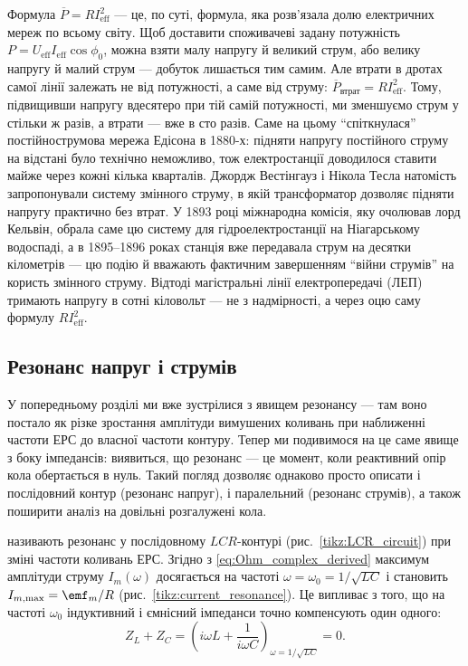 \begin{Historical}
	Формула $\overline{P} = RI_{\text{eff}}^2$ --- це, по суті, формула, яка розв'язала долю електричних мереж по всьому світу. Щоб доставити споживачеві задану потужність $P = U_{\text{eff}}I_{\text{eff}}\cos\phi_0$, можна взяти малу напругу й великий струм, або велику напругу й малий струм --- добуток лишається тим самим. Але втрати в дротах самої лінії залежать не від потужності, а саме від струму: $\overline{P}_{\text{втрат}} = RI_{\text{eff}}^2$. Тому, підвищивши напругу вдесятеро при тій самій потужності, ми зменшуємо струм у стільки ж разів, а втрати --- вже в сто разів. Саме на цьому \enquote{спіткнулася} постійнострумова мережа Едісона в 1880-х: підняти напругу постійного струму на відстані було технічно неможливо, тож електростанції доводилося ставити майже через кожні кілька кварталів. Джордж Вестінгауз і Нікола Тесла натомість запропонували систему змінного струму, в якій трансформатор дозволяє підняти напругу практично без втрат. У 1893 році міжнародна комісія, яку очолював лорд Кельвін, обрала саме цю систему для гідроелектростанції на Ніагарському водоспаді, а в 1895--1896 роках станція вже передавала струм на десятки кілометрів --- цю подію й вважають фактичним завершенням \enquote{війни струмів} на користь змінного струму. Відтоді магістральні лінії електропередачі (ЛЕП) тримають напругу в сотні кіловольт --- не з надмірності, а через оцю саму формулу $RI_{\text{eff}}^2$.
\end{Historical}

\subsection*{Резонанс напруг і струмів}\label{sec:ac_resonance}

У попередньому розділі ми вже зустрілися з явищем резонансу --- там воно постало як різке зростання амплітуди вимушених коливань при наближенні частоти ЕРС до власної частоти контуру. Тепер ми подивимося на це саме явище з боку імпедансів: виявиться, що резонанс --- це момент, коли реактивний опір кола обертається в нуль. Такий погляд дозволяє однаково просто описати і послідовний контур (резонанс напруг), і паралельний (резонанс струмів), а також поширити аналіз на довільні розгалужені кола.


 називають резонанс у послідовному
$LCR$-кон\-ту\-рі (рис.~\ref{tikz:LCR_circuit}) при зміні частоти коливань ЕРС. Згідно з \eqref{eq:Ohm_complex_derived} максимум амплітуди струму $I_m(\omega)$ досягається на частоті $\omega = \omega_0 = 1/\sqrt{LC}$ і становить $I_{m,\max} = \emf_m/R$ (рис.~\ref{tikz:current_resonance}). Це випливає з того, що на частоті $\omega_0$ індуктивний і ємнісний імпеданси точно компенсують один одного:
\begin{equation}\label{eq:impedance_compensation_2}
	Z_L + Z_C = \left(i\omega L + \frac{1}{i\omega C}\right)_{\omega = 1/\sqrt{LC}} = 0.
\end{equation}

